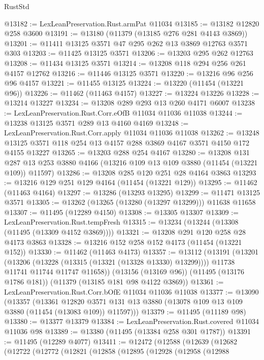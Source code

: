 \begin{lexlean}{RustStd}
\begin{coremodule}
@13182 := LexLeanPreservation.Rust.armPat @11034
@13185 := @13182 @12820 @258 @3600
@13191 := @13180 (@11379 (@13185 @276 @281 @4143 @3869))
@13201 := @11411 @13125 @3571 @47 @295 @262 @13 @3869 @12763 @3571 @303
@13203 := @11425 @13125 @3571
@13206 := @13203 @295 @262 @12763
@13208 := @11434 @13125 @3571
@13214 := @13208 @118 @294 @256 @261 @4157 @12762
@13216 := @11446 @13125 @3571
@13220 := @13216 @96 @256 @96 @4157
@13221 := @11455 @13125
@13224 := @13220 (@11454 (@13221 @96))
@13226 := @11462 (@11463 @4157)
@13227 := @13224 @13226
@13228 := @13214 @13227
@13234 := @13208 @289 @293 @13 @260 @4171 @6007
@13238 := LexLeanPreservation.Rust.Corr.eOfB @11034 @11036 @11038
@13244 := @13238 @13125 @3571 @289 @13 @4160 @4169
@13248 := LexLeanPreservation.Rust.Corr.apply @11034 @11036 @11038
@13262 := @13248 @13125 @3571 @118 @254 @13 @4157 @288 @3869 @4167 @3571 @4150 @172 @4155 @13227
@13265 := @13203 @288 @254 @4167
@13280 := @13208
    @131
    @287
    @13
    @253
    @3880
    @4166
    (@13216 @109 @13 @109 @3880 (@11454 (@13221 @109)) @11597)
@13286 := @13208 @285 @120 @251 @28 @4164 @3863
@13293 := @13216 @129 @251 @129 @4164 (@11454 (@13221 @129))
@13295 := @11462 (@11463 @4164)
@13297 := @13286 (@13293 @13295)
@13299 := @11471 @13125 @3571
@13305 := @13262 (@13265 (@13280 (@13297 @13299))) @11638 @11658
@13307 := @11495 (@12289 @4150)
@13308 := @13305 @13307
@13309 := LexLeanPreservation.Rust.tempFresh
@13315 := @13234 (@13244 (@13308 (@11495 (@13309 @4152 @3869))))
@13321 := @13208 @291 @120 @258 @28 @4173 @3863
@13328 := @13216 @152 @258 @152 @4173 (@11454 (@13221 @152))
@13330 := @11462 (@11463 @4173)
@13357 := @13112
    (@13191
      (@13201
        (@13206 (@13228 (@13315 (@13321 (@13328 @13330) @13299))))
        @11738
        @11741
        @11744
        @11747
        @11658))
    (@13156 (@13169 @96))
    (@11495 (@13176 @1786 @181))
    (@11379 (@13185 @181 @98 @4122 @3869))
@13361 := LexLeanPreservation.Rust.Corr.bOfE @11034 @11036 @11038
@13377 := @13090
    (@13357
      (@13361
        @12820
        @3571
        @131
        @13
        @3880
        (@13078 @109 @13 @109 @3880 (@11454 (@13083 @109)) @11597)))
@13379 := @11495 (@11189 @98)
@13380 := @13377 @13379
@13384 := LexLeanPreservation.Rust.covered @11034 @11036 @98
@13389 := @13380 (@11495 (@13384 @258 @301 @1787))
@13391 := @11495 (@12289 @4077)
@13411 := @12472
    (@12588
      (@12639
        (@12682
          (@12722
            (@12772
              (@12821
                (@12858
                  (@12895
                    (@12928
                      (@12958
                        (@12988

\end{coremodule}
\end{lexlean}
